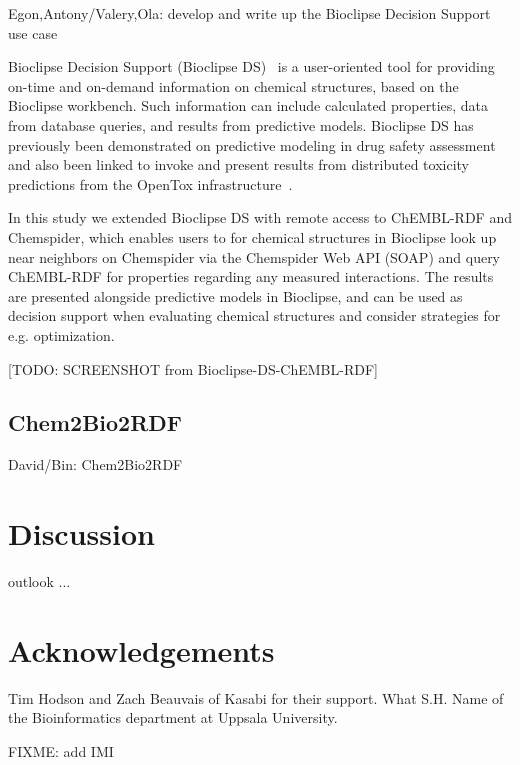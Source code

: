 \documentclass[sw]{iosart2c}
\begin{document}
Egon,Antony/Valery,Ola: develop and write up the Bioclipse Decision Support use case

Bioclipse Decision Support (Bioclipse DS)~\cite{Spjuth:2011uq} is a user-oriented tool for providing on-time and on-demand information on chemical structures, based on the Bioclipse workbench. Such information can include calculated properties, data from database queries, and results from predictive models. Bioclipse DS has previously been demonstrated on predictive modeling in drug safety assessment~\cite{Spjuth:2011uq} and also been linked to invoke and present results from distributed toxicity predictions from the OpenTox infrastructure~\cite{Willighagen:2011kx}.

In this study we extended Bioclipse DS with remote access to ChEMBL-RDF and Chemspider, which enables users to for chemical structures in Bioclipse look up near neighbors on Chemspider via the Chemspider Web API (SOAP) and query ChEMBL-RDF for properties regarding any measured interactions. The results are presented alongside predictive models in Bioclipse, and can be used as decision support when evaluating chemical structures and consider strategies for e.g. optimization.

[TODO: SCREENSHOT from Bioclipse-DS-ChEMBL-RDF]


\subsection{Chem2Bio2RDF}

David/Bin: Chem2Bio2RDF

\section{Discussion}

outlook ...

\section{Acknowledgements}

Tim Hodson and Zach Beauvais of Kasabi for their support. What S.H. Name of the Bioinformatics department at Uppsala University.

FIXME: add IMI



%
%
%
\end{document}
